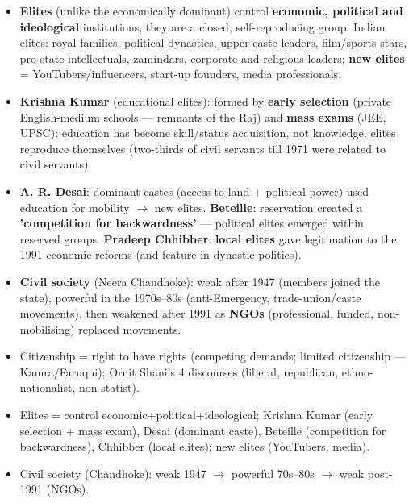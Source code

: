 \begin{KeyConcept}
\begin{itemize}
\item \textbf{Elites} (unlike the economically dominant) control \textbf{economic, political and ideological} institutions; they are a closed, self-reproducing group. Indian elites: royal families, political dynasties, upper-caste leaders, film/sports stars, pro-state intellectuals, zamindars, corporate and religious leaders; \textbf{new elites} = YouTubers/influencers, start-up founders, media professionals.
\item \textbf{Krishna Kumar} (educational elites): formed by \textbf{early selection} (private English-medium schools --- remnants of the Raj) and \textbf{mass exams} (JEE, UPSC); education has become skill/status acquisition, not knowledge; elites reproduce themselves (two-thirds of civil servants till 1971 were related to civil servants).
\item \textbf{A. R. Desai}: dominant castes (access to land + political power) used education for mobility $\rightarrow$ new elites. \textbf{Beteille}: reservation created a \textbf{'competition for backwardness'} --- political elites emerged within reserved groups. \textbf{Pradeep Chhibber}: \textbf{local elites} gave legitimation to the 1991 economic reforms (and feature in dynastic politics).
\item \textbf{Civil society} (Neera Chandhoke): weak after 1947 (members joined the state), powerful in the 1970s--80s (anti-Emergency, trade-union/caste movements), then weakened after 1991 as \textbf{NGOs} (professional, funded, non-mobilising) replaced movements.
\end{itemize}
\end{KeyConcept}

\begin{QuickRevision}
\begin{itemize}
\item Citizenship = right to have rights (competing demands; limited citizenship --- Kamra/Faruqui); Ornit Shani's 4 discourses (liberal, republican, ethno-nationalist, non-statist).
\item Elites = control economic+political+ideological; Krishna Kumar (early selection + mass exam), Desai (dominant caste), Beteille (competition for backwardness), Chhibber (local elites); new elites (YouTubers, media).
\item Civil society (Chandhoke): weak 1947 $\rightarrow$ powerful 70s--80s $\rightarrow$ weak post-1991 (NGOs).
\end{itemize}
\end{QuickRevision}
